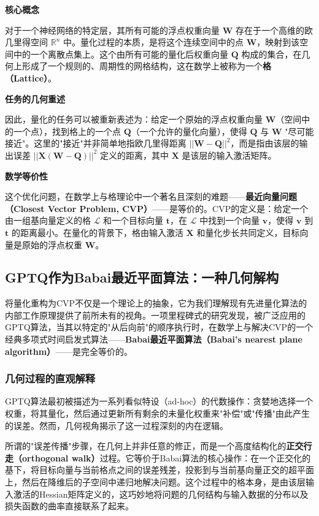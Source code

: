 \documentclass[letterpaper,twocolumn,10pt]{article}
\begin{document}
\textbf{核心概念}

对于一个神经网络的特定层，其所有可能的浮点权重向量 $\mathbf{W}$ 存在于一个高维的欧几里得空间 $\mathbb{R}^n$ 中。量化过程的本质，是将这个连续空间中的点 $\mathbf{W}$，映射到该空间中的一个离散点集上。这个由所有可能的量化后权重向量 $\mathbf{Q}$ 构成的集合，在几何上形成了一个规则的、周期性的网格结构，这在数学上被称为一个\textbf{格（Lattice）}。

\textbf{任务的几何重述}

因此，量化的任务可以被重新表述为：给定一个原始的浮点权重向量 $\mathbf{W}$（空间中的一个点），找到格上的一个点 $\mathbf{Q}$（一个允许的量化向量），使得 $\mathbf{Q}$ 与 $\mathbf{W}$ "尽可能接近"。这里的"接近"并非简单地指欧几里得距离 $||\mathbf{W} - \mathbf{Q}||^2$，而是指由该层的输出误差 $||\mathbf{X}(\mathbf{W} - \mathbf{Q})||^2$ 定义的距离，其中 $\mathbf{X}$ 是该层的输入激活矩阵。

\textbf{数学等价性}

这个优化问题，在数学上与格理论中一个著名且深刻的难题——\textbf{最近向量问题（Closest Vector Problem, CVP）}——是等价的。CVP的定义是：给定一个由一组基向量定义的格 $\mathcal{L}$ 和一个目标向量 $\mathbf{t}$，在 $\mathcal{L}$ 中找到一个向量 $\mathbf{v}$，使得 $\mathbf{v}$ 到 $\mathbf{t}$ 的距离最小。在量化的背景下，格由输入激活 $\mathbf{X}$ 和量化步长共同定义，目标向量是原始的浮点权重 $\mathbf{W}$。

\subsection{GPTQ作为Babai最近平面算法：一种几何解构}

将量化重构为CVP不仅是一个理论上的抽象，它为我们理解现有先进量化算法的内部工作原理提供了前所未有的视角。一项里程碑式的研究发现，被广泛应用的GPTQ算法，当其以特定的"从后向前"的顺序执行时，在数学上与解决CVP的一个经典多项式时间启发式算法——\textbf{Babai最近平面算法（Babai's nearest plane algorithm）}——是完全等价的。

\subsubsection{几何过程的直观解释}

GPTQ算法最初被描述为一系列看似特设（ad-hoc）的代数操作：贪婪地选择一个权重，将其量化，然后通过更新所有剩余的未量化权重来"补偿"或"传播"由此产生的误差。然而，几何视角揭示了这一过程深刻的内在逻辑。

所谓的"误差传播"步骤，在几何上并非任意的修正，而是一个高度结构化的\textbf{正交行走（orthogonal walk）}过程。它等价于Babai算法的核心操作：在一个正交化的基下，将目标向量与当前格点之间的误差残差，投影到与当前基向量正交的超平面上，然后在降维后的子空间中递归地解决问题。这个过程中的格本身，是由该层输入激活的Hessian矩阵定义的，这巧妙地将问题的几何结构与输入数据的分布以及损失函数的曲率直接联系了起来。
\end{document}
